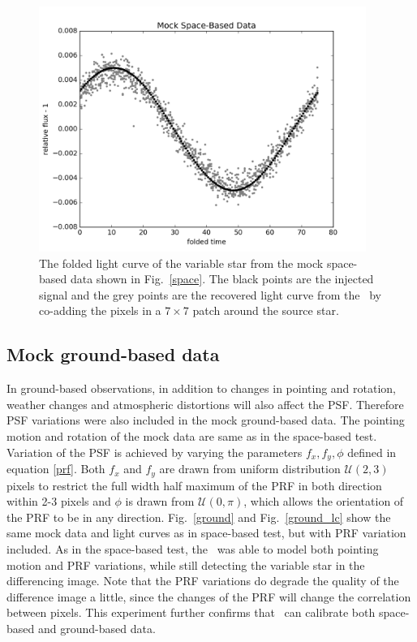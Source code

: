 \begin{figure}[p]
\begin{center}
\includegraphics[width=0.95\textwidth]{figures/cdi/f2a}
\end{center}
\caption{
\label{space_lc}
 The folded light curve of the variable star from the mock space-based data shown in Fig.~\ref{space}.
 The black points are the injected signal and the grey points are the recovered light curve from the \cpmdiff\ by co-adding the pixels in a $7\times 7$ patch around the source star.
}
\end{figure}

\subsection{Mock ground-based data}
In ground-based observations, in addition to changes in pointing and rotation, weather changes and atmospheric distortions will also affect the PSF. 
Therefore PSF variations were also included in the mock ground-based data. 
The pointing motion and rotation of the mock data are same as in the space-based test.
Variation of the PSF is achieved by varying the parameters $f_x, f_y, \phi$ defined in equation \ref{prf}.
Both $f_x$ and $f_y$ are drawn from uniform distribution ${\mathcal {U}}(2,3)$ pixels to restrict the full width half maximum of the PRF in both direction within 2-3 pixels and $\phi$ is drawn from ${\mathcal {U}}(0,\pi)$, which allows the orientation of the PRF to be in any direction.
Fig.~\ref{ground} and Fig.~\ref{ground_lc} show the same mock data and light curves as in space-based test, but with PRF variation included.  
As in the space-based test, the \cpmdiff\ was able to model both pointing motion and PRF variations, while still detecting the variable star in the differencing image.
Note that the PRF variations do degrade the quality of the difference image a little, since the changes of the PRF will change the correlation between pixels.
This experiment further confirms that \cpmdiff\ can calibrate both space-based and ground-based data.


